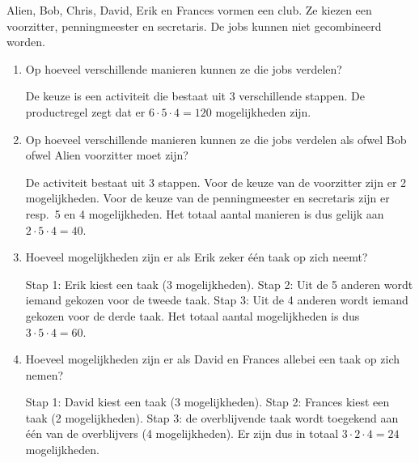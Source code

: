 \voorbeeld
Alien, Bob, Chris, David, Erik en Frances vormen een club. Ze kiezen een voorzitter, penningmeester en secretaris. De jobs kunnen niet gecombineerd worden.
\begin{enumerate}
\item Op hoeveel verschillende manieren kunnen ze die jobs verdelen?

De keuze is een activiteit die bestaat uit 3 verschillende stappen. De productregel zegt dat er $6\cdot5\cdot 4=120$ mogelijkheden zijn.
\item Op hoeveel verschillende manieren kunnen ze die jobs verdelen als ofwel Bob ofwel Alien voorzitter moet zijn?

De activiteit bestaat uit 3 stappen. Voor de keuze van de voorzitter zijn er 2 mogelijkheden. Voor de keuze van de penningmeester en secretaris zijn er resp.\ 5 en 4 mogelijkheden. Het totaal aantal manieren is dus gelijk aan $2\cdot 5\cdot 4=40$.
\item Hoeveel mogelijkheden zijn er als Erik zeker één taak op zich neemt?

Stap 1: Erik kiest een taak (3 mogelijkheden). Stap 2: Uit de 5 anderen wordt iemand gekozen voor de tweede taak. Stap 3:  Uit de 4 anderen wordt iemand gekozen voor de derde taak.  Het totaal aantal mogelijkheden is dus $3\cdot5\cdot4=60$.
\item Hoeveel mogelijkheden zijn er als David en Frances allebei een taak op zich nemen?

Stap 1: David kiest een taak (3 mogelijkheden). Stap 2: Frances kiest een taak (2 mogelijkheden). Stap 3: de overblijvende taak wordt toegekend aan één van de overblijvers (4 mogelijkheden). Er zijn dus in totaal $3\cdot2\cdot4=24$ mogelijkheden.
\end{enumerate}

